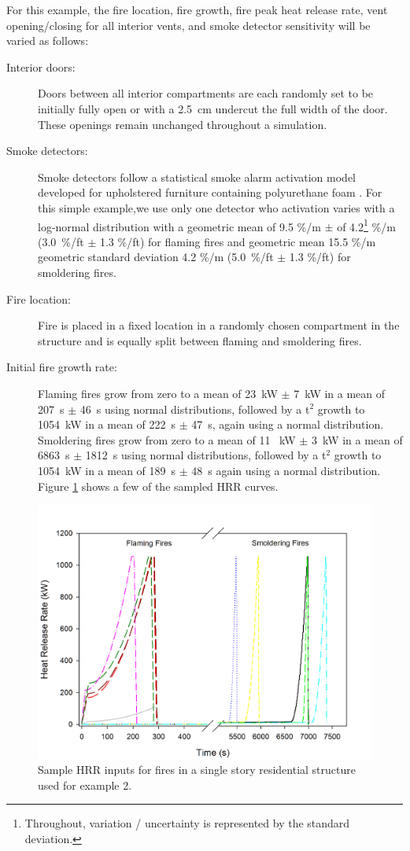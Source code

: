 \documentclass[12pt,twoside]{book}
\begin{document}
For this example, the fire location, fire growth, fire peak heat release rate, vent opening/closing for all interior vents, and smoke detector sensitivity will be varied as follows:

\begin{description}
\item[Interior doors:] Doors between all interior compartments are each randomly set to be initially fully open or with a 2.5~cm undercut the full width of the door. These openings remain unchanged throughout a simulation.
\item[Smoke detectors:] Smoke detectors follow a statistical smoke alarm activation model developed for upholstered furniture containing polyurethane foam \cite{Cleary:2017}. For this simple example,we use only one detector who activation varies with a log-normal distribution with a geometric mean of 9.5 \%/m $\pm$ of 4.2\footnote{Throughout, variation / uncertainty is represented by the standard deviation.} \%/m (3.0~\%/ft $\pm$ 1.3 \%/ft) for flaming fires and geometric mean 15.5 \%/m geometric standard deviation 4.2 \%/m (5.0~\%/ft $\pm$ 1.3 \%/ft) for smoldering fires.
    \item[Fire location:] Fire is placed in a fixed location in a randomly chosen compartment in the structure and is equally split between flaming and smoldering fires.
\item[Initial fire growth rate:] Flaming fires grow from zero to a mean of 23~kW $\pm$ 7~kW in a mean of 207~s $\pm$ 46~s using normal distributions, followed by a t$^2$ growth to 1054~kW in a mean of 222~s $\pm$ 47~s, again using a normal distribution. Smoldering fires grow from zero to a mean of 11~ kW $\pm$ 3~kW in a mean of 6863~s $\pm$ 1812~s using normal distributions, followed by a t$^2$ growth to 1054~kW in a mean of 189~s $\pm$ 48~s again using a normal distribution. Figure \ref{detector_fires} shows a few of the sampled HRR curves.
\end{description}

\begin{figure}[h!]
\centering
\includegraphics[width=4.5in]{FIGURES/Detector_HRR_Samples.jpg}
\caption{Sample HRR inputs for fires in a single story residential structure used for example 2.}
\label{detector_fires}
\end{figure}
\end{document}

